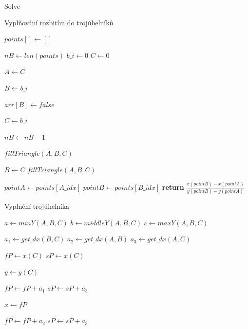 \documentclass[a4paper,12pt]{book}
\begin{document}
\begin{algorithm}
\ContinuedFloat
\caption{Solve}
\begin{algorithmic}
\caption{Vyplňování rozbitím do trojúhelníků}
\State $points[] \gets []$

\State $nB \gets len(points)$
\State $b\_i \gets 0$
\State $C \gets 0$


\State $A \gets C$

\EndWhile

\State $B \gets b\_i$

\State $arr[B] \gets false$

\EndWhile

\State $C \gets b\_i$

\State $nB \gets nB-1$

\State $fillTriangle(A,B,C)$

\EndWhile

\State $B \gets C$
\EndWhile
\State $fillTriangle(A,B,C)$
\EndFunction

    \State $pointA \gets points[A\_idx]$
    \State $pointB \gets points[B\_idx]$
    \State \textbf{return} $\frac{x(pointB)-x(pointA)}{y(pointB)-y(pointA)}$
\EndFunction
\end{algorithmic}
\end{algorithm}

\begin{algorithm}
\begin{algorithmic}
\ContinuedFloat
\caption{Vyplnění trojúhelníka}

\State $a \gets minY(A,B,C)$
\State $b \gets middleY(A,B,C)$
\State $c \gets maxY(A,B,C)$

\State $a_1 \gets get\_dx(B,C)$ %
\State $a_2 \gets get\_dx(A,B)$ %
\State $a_3 \gets get\_dx(A,C)$ %

\State $fP \gets x(C)$
\State $sP \gets x(C)$

\State $y \gets y(C)$

	\State $fP \gets fP+a_1$
	\State $sP \gets sP+a_3$
	
	\State $x \gets fP$
	\\
	\EndWhile	
\EndFor



	\State $fP \gets fP+a_2$
	\State $sP \gets sP+a_3$

	
\EndFor



\EndFunction





\end{algorithmic}
\end{algorithm}
\end{document}
